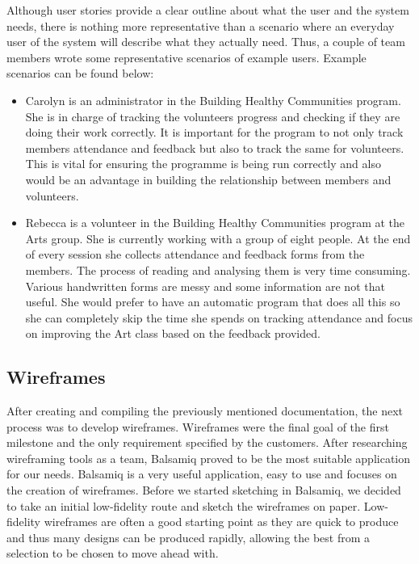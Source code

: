 \documentclass{l3proj}
\begin{document}
Although user stories provide a clear outline about what the user and the system needs, there is nothing more representative than a scenario where an everyday user of the system will describe what they actually need. Thus, a couple of team members wrote some representative scenarios of example users.
Example scenarios can be found below:
\begin{itemize}
\item Carolyn is an administrator in the Building Healthy Communities program. She is in charge of tracking the volunteers progress and checking if they are doing their work correctly. It is important for the program to not only track members attendance and feedback but also to track the same for volunteers. This is vital for ensuring the programme is being run correctly and also would be an advantage in building the relationship between members and volunteers.

\item Rebecca is a volunteer in the Building Healthy Communities program at the Arts group. She is currently working with a group of eight people. At the end of every session she collects attendance and feedback forms from the members. The process of reading and analysing them is very time consuming. Various handwritten forms are messy and some information are not that useful. She would prefer to have an automatic program that does all this so she can completely skip the time she spends on tracking attendance and focus on improving the Art class based on the feedback provided.

\end{itemize}

\subsection{Wireframes}
\label{wireframes}

After creating and compiling the previously mentioned documentation, the next process was to develop wireframes. Wireframes were the final goal of the first milestone and the only requirement specified by the customers. After researching wireframing tools as a team, Balsamiq proved to be the most suitable application for our needs. Balsamiq is a very useful application, easy to use and focuses on the creation of wireframes. Before we started sketching in Balsamiq, we decided to take an initial low-fidelity route and sketch the wireframes on paper. Low-fidelity wireframes are often a good starting point as they are quick to produce and thus many designs can be produced rapidly, allowing the best from a selection to be chosen to move ahead with.
\end{document}
